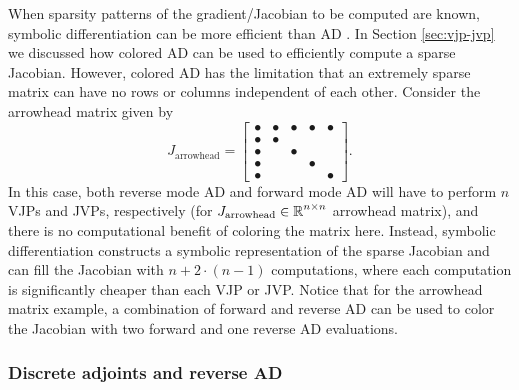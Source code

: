 When sparsity patterns of the gradient/Jacobian to be computed are known, symbolic differentiation can be more efficient than AD \cite{Lantoine_Russell_Dargent_2012}.
In Section \ref{sec:vjp-jvp} we discussed how colored AD can be used to efficiently compute a sparse Jacobian.
However, colored AD has the limitation that an extremely sparse matrix can have no rows or columns independent of each other. 
Consider the arrowhead matrix given by
\begin{equation}
    J_{\text{arrowhead}} = \begin{bmatrix}
        \bullet & \bullet & \bullet & \bullet & \bullet \\
        \bullet & \bullet &         &         &         \\
        \bullet &         & \bullet &         &         \\
        \bullet &         &         & \bullet &         \\
        \bullet &         &         &         & \bullet
    \end{bmatrix}.
\end{equation}
In this case, both reverse mode AD and forward mode AD will have to perform $n$ VJPs and JVPs, respectively (for $J_{\text{arrowhead}} \in \operatorname{\mathbb{R}}^{n \times n}$ arrowhead matrix), and there is no computational benefit of coloring the matrix here. 
Instead, symbolic differentiation constructs a symbolic representation of the sparse Jacobian and can fill the Jacobian with $n + 2 \cdot (n-1)$ computations, where each computation is significantly cheaper than each VJP or JVP. 
Notice that for the arrowhead matrix example, a combination of forward and reverse AD can be used to color the Jacobian with two forward and one reverse AD evaluations. 

\subsubsection{Discrete adjoints and reverse AD}
\label{section:comparison-discrete-adjoint-AD}


